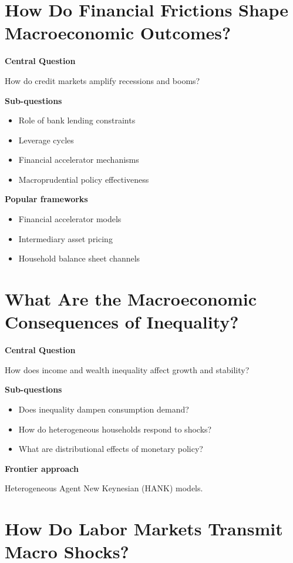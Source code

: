 \documentclass[12pt]{article}
\begin{document}
\section{How Do Financial Frictions Shape Macroeconomic Outcomes?}

\textbf{Central Question}

How do credit markets amplify recessions and booms?

\textbf{Sub-questions}
\begin{itemize}
\item Role of bank lending constraints
\item Leverage cycles
\item Financial accelerator mechanisms
\item Macroprudential policy effectiveness
\end{itemize}

\textbf{Popular frameworks}
\begin{itemize}
\item Financial accelerator models
\item Intermediary asset pricing
\item Household balance sheet channels
\end{itemize}

\section{What Are the Macroeconomic Consequences of Inequality?}

\textbf{Central Question}

How does income and wealth inequality affect growth and stability?

\textbf{Sub-questions}
\begin{itemize}
\item Does inequality dampen consumption demand?
\item How do heterogeneous households respond to shocks?
\item What are distributional effects of monetary policy?
\end{itemize}

\textbf{Frontier approach}

Heterogeneous Agent New Keynesian (HANK) models.

\section{How Do Labor Markets Transmit Macro Shocks?}
\end{document}
